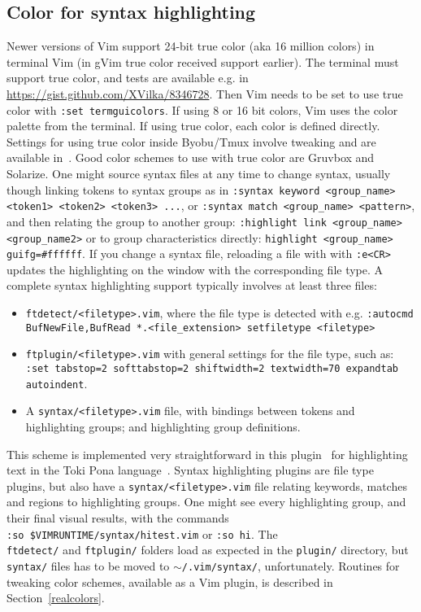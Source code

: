 \documentclass{article}
\newcommand{\tttt}[1]{\texttt{#1}}
\begin{document}
\subsection{Color for syntax highlighting}\label{visual2}
Newer versions of Vim support 24-bit true color (aka 16 million colors)
in terminal Vim (in gVim true color received support earlier).
The terminal must support true color, and tests are available e.g. in
\url{https://gist.github.com/XVilka/8346728}.
Then Vim needs to be set to use true color with
\tttt{:set termguicolors}.
If using 8 or 16 bit colors, Vim uses the color palette from the
terminal. If using true color, each color is defined directly.
Settings for using true color inside Byobu/Tmux involve tweaking
and are available in~\cite{vimrc}.
Good color schemes to use with true color are Gruvbox
and Solarize.
One might source syntax files at any time to change syntax, usually
though linking tokens to syntax groups as in
\tttt{:syntax keyword <group\_name> <token1> <token2> <token3> ...},
or
\tttt{:syntax match <group\_name>	<pattern>},
and then relating the group to another group: 
\tttt{:highlight link <group\_name> <group\_name2>}
or to group characteristics directly:
\tttt{highlight <group\_name> guifg=\#ffffff}.
If you change a syntax file, reloading a file with with \tttt{:e<CR>}
updates the highlighting on the window with the corresponding file type.
A complete syntax highlighting support typically involves at least three files:
\begin{itemize}
  \item \tttt{ftdetect/<filetype>.vim}, where the file type is
    detected with e.g.
    \tttt{:autocmd BufNewFile,BufRead *.<file\_extension> setfiletype <filetype>}
  \item \tttt{ftplugin/<filetype>.vim} with general settings for the
    file type, such as: 
    \tttt{:set tabstop=2 softtabstop=2 shiftwidth=2 textwidth=70
    expandtab autoindent}.
  \item A \tttt{syntax/<filetype>.vim} file, with bindings between
    tokens and highlighting groups; and highlighting group definitions.
\end{itemize}

This scheme is implemented very straightforward in this
plugin~\cite{tokipona}
for highlighting text in the Toki Pona language~\cite{tpLang}.
Syntax highlighting plugins are file type plugins,
but also have a \tttt{syntax/<filetype>.vim} file
relating keywords, matches and regions to highlighting groups. 
One might see every highlighting group, and their final visual results,
with the commands\\
\tttt{:so \$VIMRUNTIME/syntax/hitest.vim}
or \tttt{:so hi}.
The\\ \tttt{ftdetect/} and \tttt{ftplugin/} folders load as expected in the \tttt{plugin/}
directory, but \tttt{syntax/} files has to be moved to
\tttt{$\sim$/.vim/syntax/}, unfortunately.
Routines for tweaking color schemes, available as a Vim plugin,
is described in Section~\ref{realcolors}.
\end{document}
